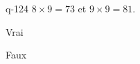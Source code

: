 \begin{truefalse}{q-124}
$8\times 9 = 73$ et $9\times 9 = 81$.
\item Vrai
\item* Faux
\end{truefalse}


